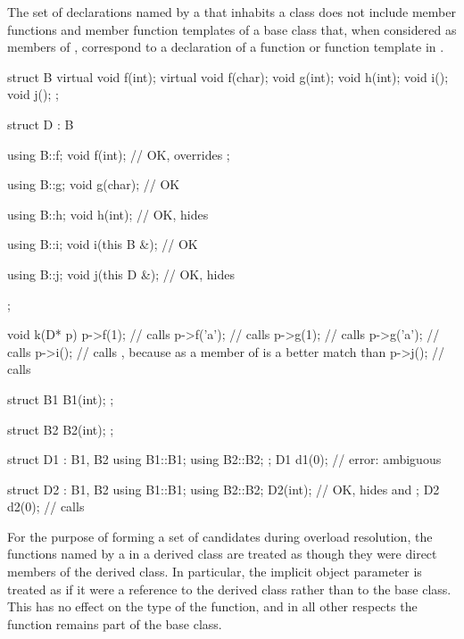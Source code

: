 \pnum
{}%
The set of declarations named by a 
that inhabits a class  does not include
member functions and member function templates of a base class that,
when considered as members of ,
correspond to a declaration of a function or function template in .
\begin{example}
\begin{codeblock}
struct B {
  virtual void f(int);
  virtual void f(char);
  void g(int);
  void h(int);
  void i();
  void j();
};

struct D : B {
  using B::f;
  void f(int);      // OK,  overrides ;

  using B::g;
  void g(char);     // OK

  using B::h;
  void h(int);      // OK,  hides 

  using B::i;
  void i(this B &); // OK

  using B::j;
  void j(this D &); // OK,  hides 
};

void k(D* p)
{
  p->f(1);          // calls 
  p->f('a');        // calls 
  p->g(1);          // calls 
  p->g('a');        // calls 
  p->i();           // calls , because  as a member of  is a better match than 
  p->j();           // calls 
}

struct B1 {
  B1(int);
};

struct B2 {
  B2(int);
};

struct D1 : B1, B2 {
  using B1::B1;
  using B2::B2;
};
D1 d1(0);           // error: ambiguous

struct D2 : B1, B2 {
  using B1::B1;
  using B2::B2;
  D2(int);          // OK,  hides  and 
};
D2 d2(0);           // calls 
\end{codeblock}
\end{example}

\pnum
{}%
\begin{note}
For the purpose of forming a set of candidates during overload resolution,
the functions
named by a  in a derived class
are treated as though they were direct members of the derived class. In
particular, the implicit object parameter is treated as if
it were a reference to the derived class rather than to the base class.
This has no effect on the type of the function, and in all other
respects the function remains part of the base class.
\end{note}

